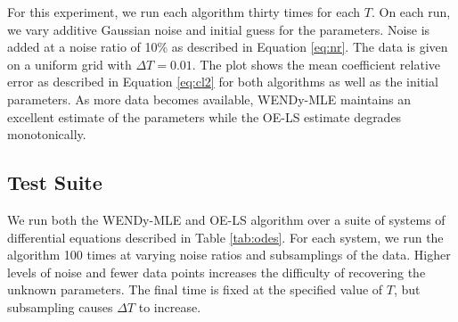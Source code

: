 For this experiment, we run each algorithm thirty times for each $T$. On each run, we vary additive Gaussian noise and initial guess for the parameters. Noise is added at a noise ratio of 10\% as described in Equation \eqref{eq:nr}. The data is given on a uniform grid with $\Delta T = 0.01$. The plot shows the mean coefficient relative error as described in Equation \eqref{eq:cl2} for both algorithms as well as the initial parameters. As more data becomes available, WENDy-MLE maintains an excellent estimate of the parameters while the OE-LS estimate degrades monotonically. 

\subsection{Test Suite} \label{sec:mega}

We run both the WENDy-MLE and OE-LS algorithm over a suite of systems of differential equations described in Table \ref{tab:odes}. For each system, we run the algorithm 100 times at varying noise ratios and subsamplings of the data. Higher levels of noise and fewer data points increases the difficulty of recovering the unknown parameters. The final time is fixed at the specified value of $T$, but subsampling causes $\Delta T$ to increase.   

